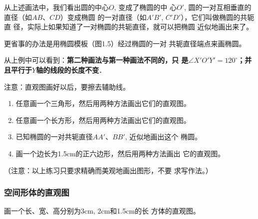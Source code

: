 \begin{example}
从上述画法中，我们看出圆的中心$O$, 变成了椭圆的中
心$O'$, 圆的一对互相垂直的直径（如$AB$、$CD$）变成椭圆
的一对直径（如$A'B'$, $C'D'$），它们叫做椭圆的共轭直
径，实际上如果知道了一对椭圆的共轭直径，就可以把椭圆
近似地画出来了。

更省事的办法是用椭圆模板（图1.5）经过椭圆的一对
共轭直径端点来画椭圆。
\begin{figure}[htp]
    \centering
{}
    \caption{}
\end{figure}

从上例中可以看到：\textbf{第二种画法与第一种画法不同的，只
是$\angle X'O'Y'=120^{\circ}$；并且平行于$Y$轴的线段的长度不变}．

注意：直观图画好以后，要擦去辅助线。
\end{example}

\begin{ex}
\begin{enumerate}
\item 任意画一个三角形，然后用两种方法画出它们的直观图。
\item 任意画一个长方形，然后用两种方法画出它们的直观图。
\item 已知椭圆的一对共轭直径$AA'$、$BB'$, 近似地画出这个
椭圆。
\item 画一个边长为1.5cm的正六边形，然后用两种方法画出
它的直观图。
\end{enumerate}

（注意：以上练习只要求精确而美观地画出图形，不要
求写作法。）
\end{ex}

\subsubsection{空间形体的直观图}
\begin{example}
    画一个长、宽、高分别为3cm, 2cm和1.5cm的长
方体的直观图。
\end{example}

